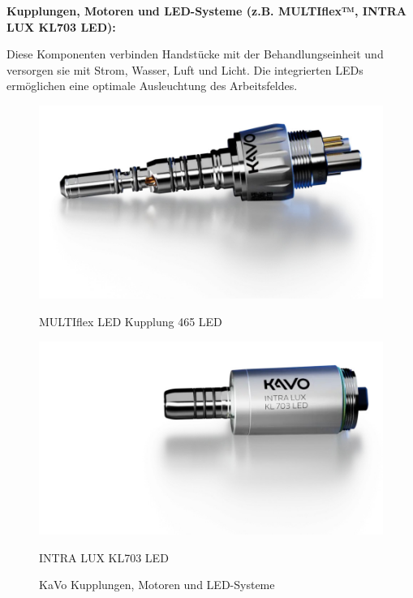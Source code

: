 \textbf{Kupplungen, Motoren und LED-Systeme (z.B. MULTIflex™, INTRA LUX KL703 LED):}

Diese Komponenten verbinden Handstücke mit der Behandlungseinheit und versorgen sie mit Strom, Wasser, Luft und Licht. Die integrierten LEDs ermöglichen eine optimale Ausleuchtung des Arbeitsfeldes.

\begin{figure}[H]
  \centering
  \begin{minipage}[b]{0.45\textwidth}
    \centering
    \includegraphics[width=\textwidth]{images/MULTIflex-465LED-transparent-1000px.jpg}
    \caption*{MULTIflex LED Kupplung 465 LED}
  \end{minipage}
  \hspace{0.05\textwidth}
  \begin{minipage}[b]{0.45\textwidth}
    \centering
    \includegraphics[width=\textwidth]{images/Motor-KL-703-LED_transparent-1000px.jpg}
    \caption*{INTRA LUX KL703 LED}
  \end{minipage}
  \caption{KaVo Kupplungen, Motoren und LED-Systeme}
  \label{fig:Kupplungen,Motoren und LED-Systeme}
\end{figure}
\vspace{1em}

